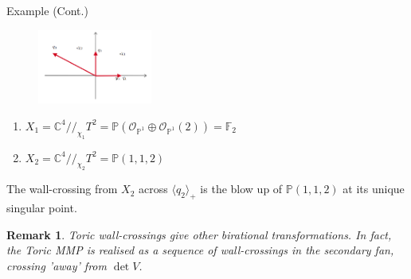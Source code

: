 \documentclass{beamer}
\newtheorem{remark}[theorem]{Remark}
\begin{document}
\begin{frame}{Example (Cont.)}
    
\begin{figure}[!h]
    \centering
    \includegraphics[width = 3.75cm]{secondary fan.png}
\end{figure}

\begin{enumerate}
    \item $X_{1}= \mathbb{C}^{4}//_{\chi_{1}}T^{2}= \mathbb{P}(\mathcal{O}_{\mathbb{P}^{1}}\oplus \mathcal{O}_{\mathbb{P}^{1}}(2)) = \mathbb{F}_2$
    \item $X_{2}= \mathbb{C}^{4}//_{\chi_{2}}T^{2}= \mathbb{P}(1,1,2)$
\end{enumerate}
The wall-crossing from $X_2$ across $\langle q_2 \rangle_+$ is the blow up of $\mathbb{P}(1,1,2)$ at its unique singular point. 

\begin{remark}
    Toric wall-crossings give other birational transformations. In fact, the Toric MMP is realised as a sequence of wall-crossings in the secondary fan, crossing 'away' from $\det V$. 
\end{remark}
  
\end{frame}
\end{document}
